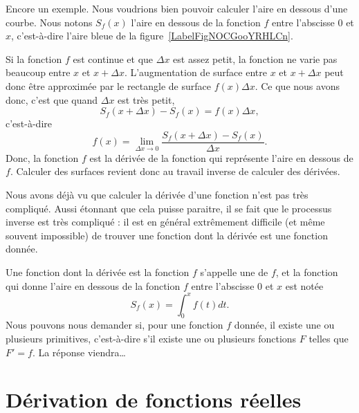 Encore un exemple. Nous voudrions bien pouvoir calculer l'aire en dessous d'une courbe. Nous notons $S_f(x)$ l'aire en dessous de la fonction $f$ entre l'abscisse $0$ et $x$, c'est-à-dire l'aire bleue de la figure~\ref{LabelFigNOCGooYRHLCn}. %
\newcommand{\CaptionFigNOCGooYRHLCn}{L'aire en dessous d'une courbe. Le rectangle rouge d'aire $f(x)\Delta x$ approxime l'augmentation de l'aire lorsqu'on passe de $x$ à $x+\Delta x$.}


Si la fonction $f$ est continue et que $\Delta x$ est assez petit, la fonction ne varie pas beaucoup entre $x$ et $x+\Delta x$. L'augmentation de surface entre $x$ et $x+\Delta x$ peut donc être approximée par le rectangle de surface $f(x)\Delta x$. Ce que nous avons donc, c'est que quand $\Delta x$ est très petit,
\begin{equation}
	S_f(x+\Delta x)-S_f(x)=f(x)\Delta x,
\end{equation}
c'est-à-dire
\begin{equation}
	f(x)=\lim_{\Delta x\to 0}\frac{  S_f(x+\Delta x)-S_f(x)}{ \Delta x }.
\end{equation}
Donc, la fonction $f$ est la dérivée de la fonction qui représente l'aire en dessous de $f$. Calculer des surfaces revient donc au travail inverse de calculer des dérivées.

Nous avons déjà vu que calculer la dérivée d'une fonction n'est pas très compliqué. Aussi étonnant que cela puisse paraitre, il se fait que le processus inverse est très compliqué : il est en général extrêmement difficile (et même souvent impossible) de trouver une fonction dont la dérivée est une fonction donnée.

Une fonction dont la dérivée est la fonction $f$ s'appelle une  de $f$, et la fonction qui donne l'aire en dessous de la fonction $f$ entre l'abscisse $0$ et $x$ est notée
\begin{equation}
	S_f(x)=\int_0^xf(t)dt.
\end{equation}
Nous pouvons nous demander si, pour une fonction $f$ donnée, il existe une ou plusieurs primitives, c'est-à-dire s'il existe une ou plusieurs fonctions $F$ telles que $F'=f$. La réponse viendra\ldots

\section{Dérivation de fonctions réelles}
\label{seccontetderiv}

